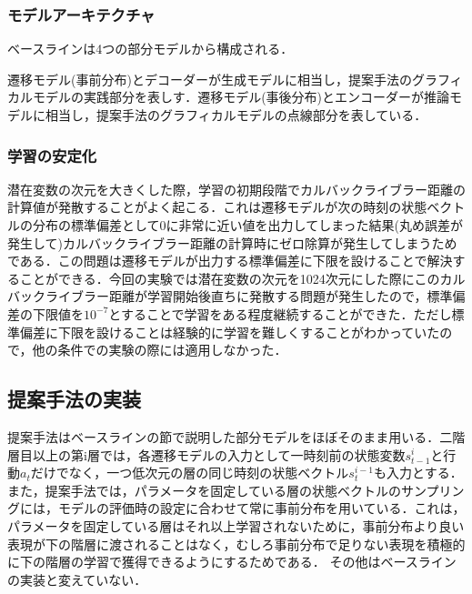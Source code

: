 \documentclass[10pt, twocolumn]{jarticle}
\begin{document}
\subsubsection{モデルアーキテクチャ}
ベースラインは4つの部分モデルから構成される．

遷移モデル(事前分布)とデコーダーが生成モデルに相当し，提案手法のグラフィカルモデルの実践部分を表しす．遷移モデル(事後分布)とエンコーダーが推論モデルに相当し，提案手法のグラフィカルモデルの点線部分を表している．

\subsubsection{学習の安定化}
潜在変数の次元を大きくした際，学習の初期段階でカルバックライブラー距離の計算値が発散することがよく起こる．これは遷移モデルが次の時刻の状態ベクトルの分布の標準偏差として0に非常に近い値を出力してしまった結果(丸め誤差が発生して)カルバックライブラー距離の計算時にゼロ除算が発生してしまうためである．この問題は遷移モデルが出力する標準偏差に下限を設けることで解決することができる．今回の実験では潜在変数の次元を1024次元にした際にこのカルバックライブラー距離が学習開始後直ちに発散する問題が発生したので，標準偏差の下限値を$10^{-7}$とすることで学習をある程度継続することができた．ただし標準偏差に下限を設けることは経験的に学習を難しくすることがわかっていたので，他の条件での実験の際には適用しなかった．

\subsection{提案手法の実装}
提案手法はベースラインの節で説明した部分モデルをほぼそのまま用いる．二階層目以上の第i層では，各遷移モデルの入力として一時刻前の状態変数$s^i_{t-1}$と行動$a_t$だけでなく，一つ低次元の層の同じ時刻の状態ベクトル$s^{i-1}_t$も入力とする．また，提案手法では，パラメータを固定している層の状態ベクトルのサンプリングには，モデルの評価時の設定に合わせて常に事前分布を用いている．これは，パラメータを固定している層はそれ以上学習されないために，事前分布より良い表現が下の階層に渡されることはなく，むしろ事前分布で足りない表現を積極的に下の階層の学習で獲得できるようにするためである．
その他はベースラインの実装と変えていない．
\end{document}
